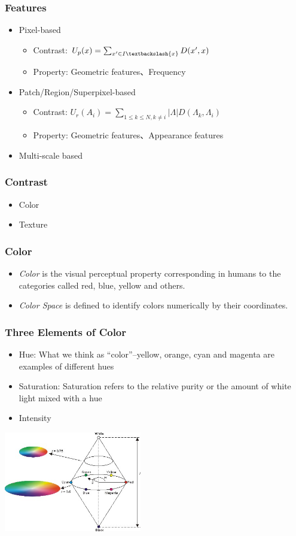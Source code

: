 \documentclass[notheorems,serif,table,compress]{beamer}  %
\begin{document}
\begin{frame}
\frametitle{Features}
\begin{itemize}
\item Pixel-based
\begin{itemize}
\item Contrast: $U_p(x) = \sum_{x'\in I\textbackslash \{ x\}}D(x', x)$
\item Property: Geometric features、Frequency
\end{itemize}
\item Patch/Region/Superpixel-based
\begin{itemize}
\item Contrast: $U_r(A_i) = \sum_{1\le k \le N, k \ne i}|\Lambda|D(\Lambda_k, \Lambda_i)$
\item Property: Geometric features、Appearance features
\end{itemize}
\item Multi-scale based
\end{itemize}
\end{frame}


\begin{frame}
\frametitle{Contrast}
\begin{itemize}
\item Color
\item Texture
\end{itemize}
\end{frame}


\begin{frame}
\frametitle{Color}
\begin{itemize}
\item {\color{blue}\emph{Color}} is the visual perceptual property corresponding in humans to the categories called red, blue, yellow and others.
\item {\color{blue}\emph{Color Space}} is defined to identify colors numerically by their coordinates.
\end{itemize}
\end{frame}


\begin{frame}
\frametitle{Three Elements of Color}
\begin{itemize}
\item Hue: What we think as ``color''--yellow, orange, cyan and magenta are examples of different hues
\item Saturation: Saturation refers to the relative purity or the amount of white light mixed with a hue
\item Intensity
\end{itemize}
\centering\includegraphics[width=6cm]{HSIColorModel.jpg}
\end{frame}
\end{document}
